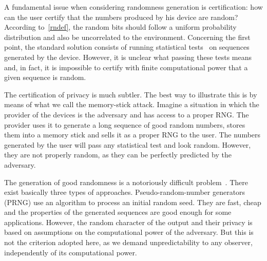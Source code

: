 \documentclass[11pt,a4paper]{article}
\begin{document}
A fundamental issue when considering randomness generation is
certification: how can the user certify that the numbers produced
by his device are random? According to~\eqref{rndef}, the random bits should follow a uniform probability
distribution and also be uncorrelated to the
environment. Concerning the first point, the standard solution
consists of running statistical tests~\cite{nist} on
sequences generated by the device. However, it is unclear what
passing these tests means and, in fact, it is impossible to certify
with finite computational power that a given sequence is random.

The certification of privacy is much subtler. The best way to
illustrate this is by means of what we call the memory-stick
attack. Imagine a situation in which the provider of the devices is the adversary and has
access to a proper RNG. The provider uses it to generate a long
sequence of good random numbers, stores them into a memory stick
and sells it as a proper RNG to the user. The numbers generated by
the user will pass any statistical test
and look random. %
However, they are not properly random, as they can be
perfectly predicted by the adversary. %


The generation of good randomness is a notoriously difficult
problem~\cite{vonneumann, sadhistory}. There exist basically three types of
approaches. Pseudo-random-number generators (PRNG) use an algorithm to process an initial random seed. They are fast,
cheap and the properties of the generated sequences are good
enough for some applications.
However, the random character of the output and their privacy is based on
assumptions on the computational power of the  adversary.
But this is not the criterion adopted here, as we demand
unpredictability to any observer, independently of its computational power.
\end{document}
